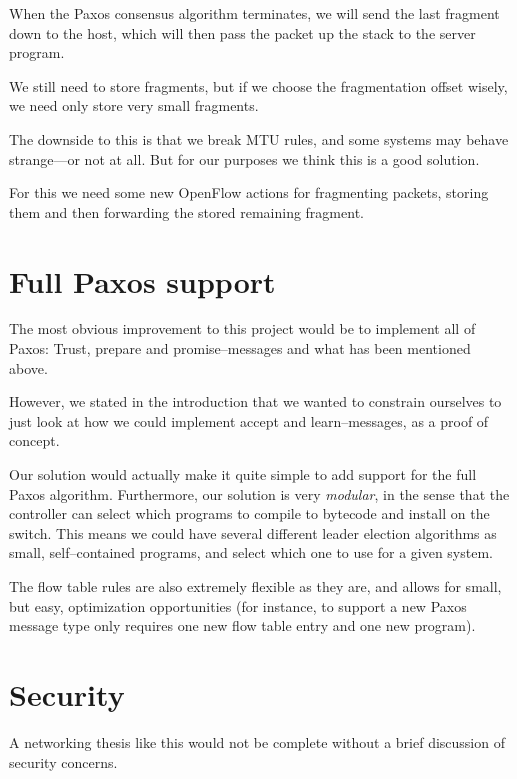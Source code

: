 When the Paxos consensus algorithm terminates, we will send the last
fragment down to the host, which will then pass the packet up the stack to
the server program.

We still need to store fragments, but if we choose the fragmentation offset
wisely, we need only store very small fragments.

The downside to this is that we break MTU rules, and some systems may behave
strange---or not at all.  But for our purposes we think this is a good
solution.

For this we need some new OpenFlow actions for fragmenting packets, storing
them and then forwarding the stored remaining fragment.

\section{Full Paxos support}

The most obvious improvement to this project would be to implement all of
Paxos: Trust, prepare and promise--messages and what has been mentioned
above.

However, we stated in the introduction that we wanted to constrain ourselves
to just look at how we could implement accept and learn--messages, as a
proof of concept.

Our solution would actually make it quite simple to add support for the full
Paxos algorithm.  Furthermore, our solution is very \textit{modular}, in the
sense that the controller can select which programs to compile to bytecode
and install on the switch.  This means we could have several different
leader election algorithms as small, self--contained programs, and select
which one to use for a given system.

The flow table rules are also extremely flexible as they are, and allows for
small, but easy, optimization opportunities (for instance, to support a new
Paxos message type only requires one new flow table entry and one new
program).


\section{Security}

A networking thesis like this would not be complete without a brief
discussion of security concerns.


